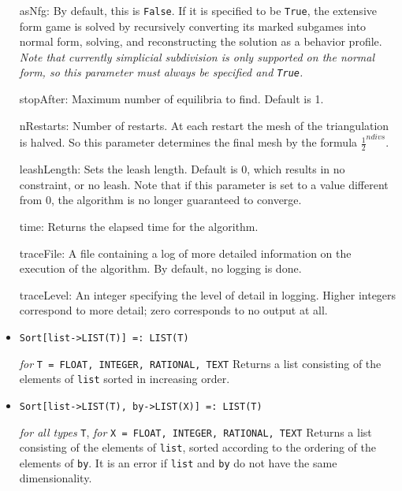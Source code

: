 \begin{itemize}
{\it for} {\tt T = FLOAT, RATIONAL}
\bd
Computes a Nash equilibrium for a game using a simplicial subdivision
algorithm. 

The behavior of the algorithm may be modified by several optional
parameters:

\bd
\item
[asNfg:] By default, this is \verb+False+.  If it is specified to be
\verb+True+, the extensive form game is solved by recursively converting
its marked subgames into normal form, solving, and reconstructing the
solution as a behavior profile.  {\it Note that currently simplicial
subdivision is only supported on the normal form, so this parameter
must always be specified and {\tt True}.}
\item
[stopAfter:] Maximum number of equilibria to find. Default is 1.  
\item 
[nRestarts:] Number of restarts.  At each restart the mesh of the
triangulation is halved.  So this parameter determines the final mesh
by the formula $\frac{1}{2}^{ndivs}$.
\item
[leashLength:] Sets the leash length. Default is 0, which results in no
constraint, or no leash.  Note that if this parameter is set to a value
different from 0, the algorithm is no longer guaranteed to converge.
\item
[time:] Returns the elapsed time for the algorithm.
\item
[traceFile:] A file containing a log of more detailed information on the
execution of the algorithm.  By default, no logging is done.
\item
[traceLevel:] An integer specifying the level of detail in logging.
Higher integers correspond to more detail; zero corresponds to
no output at all.
\ed
\ed

\item{}
\protect \large \begin{verbatim}
Sort[list->LIST(T)] =: LIST(T)
\end{verbatim} \normalsize

{\it for} {\tt T = FLOAT, INTEGER, RATIONAL, TEXT}
\bd
Returns a list consisting of the elements of \verb+list+ sorted in
increasing order.
\ed

\item{}
\protect \large \begin{verbatim}
Sort[list->LIST(T), by->LIST(X)] =: LIST(T)
\end{verbatim} \normalsize

{\it for all types} {\tt T}, {\it for} {\tt X = FLOAT, INTEGER, RATIONAL,
TEXT}
\bd
Returns a list consisting of the elements of \verb+list+, sorted
according to the ordering of the elements of \verb+by+.  It is an
error if \verb+list+ and \verb+by+ do not have the same dimensionality.
\ed


\end{itemize}
